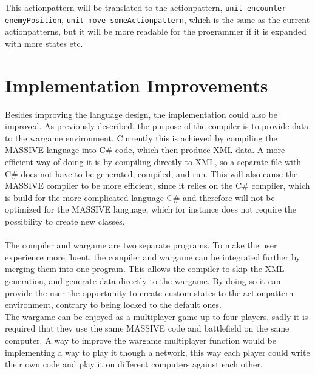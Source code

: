 This actionpattern will be translated to the actionpattern, \texttt{unit encounter enemyPosition}, \texttt{unit move someActionpattern}, which is the same as the current actionpatterns, but it will be more readable for the programmer if it is expanded with more states etc.


\section{Implementation Improvements}
Besides improving the language design, the implementation could also be improved. As previously described, the purpose of the compiler is to provide data to the wargame environment.
Currently this is achieved by compiling the MASSIVE language into C\# code, which then produce XML data. 
A more efficient way of doing it is by compiling directly to XML, so a separate file with C\# does not have to be generated, compiled, and run. 
This will also cause the MASSIVE compiler to be more efficient, since it relies on the C\# compiler, which is build for the more complicated language C\# and therefore will not be optimized for the MASSIVE language, which for instance does not require the possibility to create new classes.\\
 \\
The compiler and wargame are two separate programs. To make the user experience more fluent, the compiler and wargame can be integrated further by merging them into one program.
This allows the compiler to skip the XML generation, and generate data directly to the wargame. By doing so it can provide the user the opportunity to create custom states to the actionpattern environment, contrary to being locked to the default ones.\newline
 \\
The wargame can be enjoyed as a multiplayer game up to four players, sadly it is required that they use the same MASSIVE code and battlefield on the same computer. A way to improve the wargame multiplayer function would be implementing a way to play it though a network, this way each player could write their own code and play it on different computers against each other.

